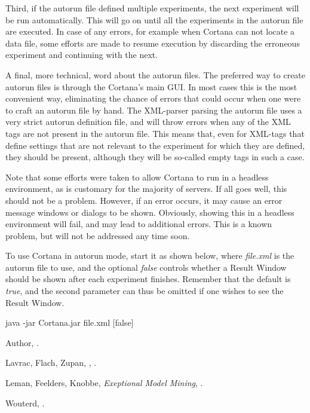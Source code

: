 \documentclass{article}
\begin{document}
Third, if the autorun file defined multiple experiments, the next experiment will be run automatically.
This will go on until all the experiments in the autorun file are executed.
In case of any errors, for example when Cortana can not locate a data file, some efforts are made to resume execution by discarding the erroneous experiment and continuing with the next.

A final, more technical, word about the autorun files.
The preferred way to create autorun files is through the Cortana's main GUI.
In most cases this is the most convenient way, eliminating the chance of errors that could occur when one were to craft an autorun file by hand.
The XML-parser parsing the autorun file uses a very strict autorun definition file, and will throw errors when any of the XML tags are not present in the autorun file.
This means that, even for XML-tags that define settings that are not relevant to the experiment for which they are defined, they should be present, although they will be so-called empty tags in such a case.

Note that some efforts were taken to allow Cortana to run in a headless environment, as is customary for the majority of servers.
If all goes well, this should not be a problem.
However, if an error occurs, it may cause an error message windows or dialogs to be shown.
Obviously, showing this in a headless environment will fail, and may lead to additional errors.
This is a known problem, but will not be addressed any time soon.

To use Cortana in autorun mode, start it as shown below, where \emph{file.xml} is the autorun file to use, and the optional \emph{false} controls whether a Result Window should be shown after each experiment finishes.
Remember that the default is \emph{true}, and the second parameter can thus be omitted if one wishes to see the Result Window.

java -jar Cortana.jar file.xml [false]





\begin{thebibliography}{10}

Author,
.

Lavrac, Flach, Zupan,
,
.

Leman, Feelders, Knobbe,
\newblock \emph{Exeptional Model Mining},
.

Wouterd,
.

\end{thebibliography}
\end{document}
